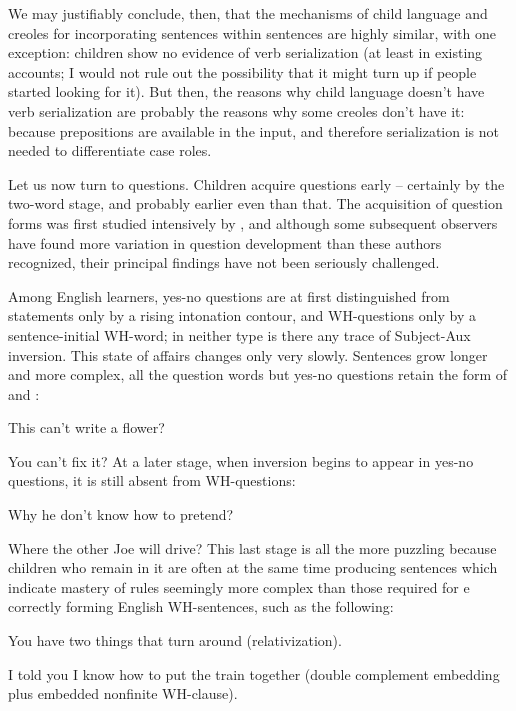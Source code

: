 We may justifiably conclude, then, that the mechanisms of child language and creoles for incorporating sentences within sentences are highly similar, with one exception: children show no evidence of verb serialization (at least in existing accounts; I would not rule out the possibility that it might turn up if people started looking for it). But then, the reasons why child language doesn't have verb serialization are probably the reasons why some creoles don't have it: because prepositions are available in the input, and therefore serialization is not needed to differentiate case roles.

Let us now turn to questions. Children acquire questions early -- certainly by the two-word stage, and probably earlier even than that. The acquisition of question forms was first studied intensively by \citet{KlimaEtAl1966}, and although some subsequent observers have found more variation in question development than these authors recognized, their principal findings have not been seriously challenged.

Among English learners, yes-no questions are at first distinguished from statements only by a rising intonation contour, and WH-questions only by a sentence-initial WH-word; in neither type is there any trace of Subject-Aux inversion. This state of affairs changes only very slowly. Sentences grow longer and more complex, all the question words but yes-no questions retain the form of  and :

\ea\label{ex:3:51}
 This can't write a flower? 
\z

\ea\label{ex:3:52}
 You can't fix it? 
\z
At a later stage, when inversion begins to appear in yes-no questions, it is still absent from WH-questions:

\ea\label{ex:3:53}
 Why he don't know how to pretend? 
\z

\ea\label{ex:3:54}
 Where the other Joe will drive? 
\z
This last stage is all the more puzzling because children who remain in it are often at the same time producing sentences which indicate mastery of rules seemingly more complex than those required for e correctly forming English WH-sentences, such as the following:

\ea\label{ex:3:55}
 You have two things that turn around (relativization). 
\z

\ea\label{ex:3:56}
 I told you I know how to put the train together (double complement embedding plus embedded nonfinite WH-clause). 
\z

